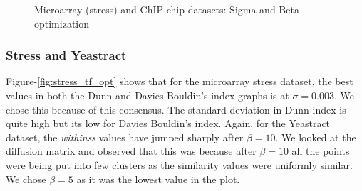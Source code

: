 \begin{figure}[htp]
\begin{center}
  \end{center}
  \caption{Microarray (stress) and ChIP-chip datasets: Sigma and Beta optimization}
  \label{fig:stress_chip_opt}
\end{figure}

\subsubsection{Stress and Yeastract}
Figure-\ref{fig:stress_tf_opt} shows that for the microarray stress dataset, the best values in both the Dunn and Davies Bouldin's index graphs is at $\sigma=0.003$. We chose this because of this consensus. The standard deviation in Dunn index is quite high but its low for Davies Bouldin's index. Again, for the Yeastract dataset, the \textit{withinss} values have jumped sharply after $\beta=10$. We looked at the diffusion matrix and observed that this was because after $\beta=10$ all the points were being put into few clusters as the similarity values were uniformly similar. We chose $\beta=5$ as it was the lowest value in the plot. 
